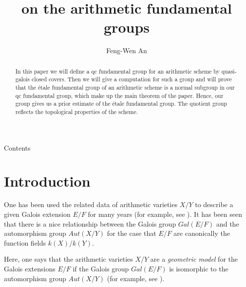 \documentclass[12pt,twoside,reqno]{amsart}
\theoremstyle{definition}
\numberwithin{equation}{section}
\begin{document}
\title{on the arithmetic fundamental groups}
\author{Feng-Wen An}
\address{School of Mathematics and Statistics, Wuhan University, Wuhan,
Hubei 430072, People's Republic of China}

\begin{abstract}
In this paper we will define a qc fundamental group for an arithmetic scheme by quasi-galois closed covers. Then we will give a computation for such a group and will prove that the \'{e}tale fundamental group of an arithmetic scheme is a normal subgroup in our qc fundamental group, which make up the main theorem of the paper. Hence, our group gives us a prior estimate of the \'{e}tale fundamental group. The quotient group reflects the topological properties of the scheme.
\end{abstract}

\maketitle

\begin{center}
{\tiny {Contents} }
\end{center}

{\tiny {} }

{\tiny {} }

{\tiny {} }

{\tiny {}}

{\tiny {}}

\section*{Introduction}

One  has been
 used the related data of arithmetic varieties $X/Y$ to describe
a given Galois extension $E/F$ for many years (for example, see \cite
{Bloch,Kato,Schmidt,Raskind,Saito,VS1,w1,w2}). It has been seen that there is a nice relationship
 between the Galois group $Gal(E/F)$ and the automorphism group $Aut(X/Y)$ for the case that $E/F$ are canonically the function fields $k(X)/k(Y)$.

 Here, one says that the arithmetic varieties $X/Y$ are a
\emph{geometric model} for the Galois extensions $E/F$ if the Galois group $
Gal\left( E/F\right) $ is isomorphic to the automorphism group ${Aut}\left(
X/Y\right) $ (for example, see \cite{SGA1,Raskind,VS1,SV2}).
\end{document}
